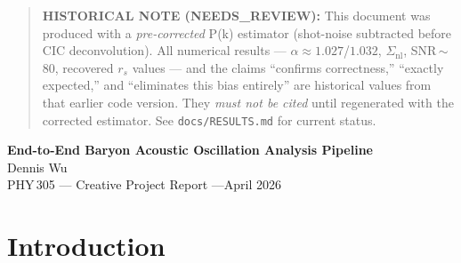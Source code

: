 \documentclass[10pt]{article}
\begin{document}
\begin{quote}
  \color{red}
  \textbf{HISTORICAL NOTE (NEEDS\_REVIEW):} This document was produced with
  a \emph{pre-corrected} P(k) estimator (shot-noise subtracted before CIC
  deconvolution).  All numerical results --- $\alpha \approx 1.027$/$1.032$,
  $\Sigma_\mathrm{nl}$, SNR\,$\sim$\,80, recovered $r_s$ values --- and the
  claims ``confirms correctness,'' ``exactly expected,'' and ``eliminates
  this bias entirely'' are historical values from that earlier code version.
  They \emph{must not be cited} until regenerated with the corrected estimator.
  See \texttt{docs/RESULTS.md} for current status.
\end{quote}

\bigskip

\begin{center}
  {\Large\bfseries End-to-End Baryon Acoustic Oscillation Analysis Pipeline}\\[6pt]
  {\large Dennis Wu}\\[2pt]
  {PHY\,305 --- Creative Project Report \quad---\quad April 2026}
\end{center}

\section{Introduction}
\end{document}
